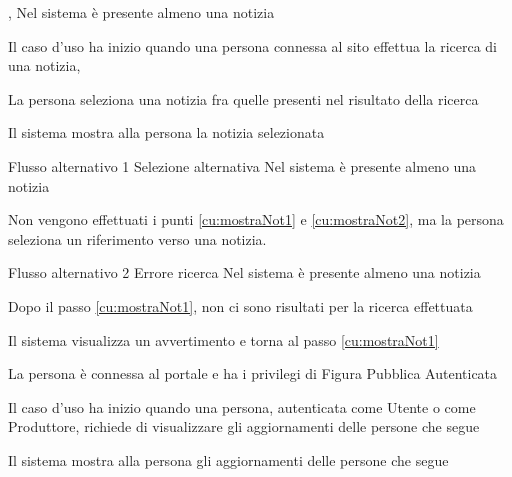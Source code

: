 %

\tabcuvspace

{, }
{Nel sistema è presente almeno una notizia}
{\postNulle}
{\begin{enumCU}
	\item Il caso d'uso ha inizio quando una persona connessa al sito effettua la ricerca di una notizia, \label{cu:mostraNot1}
	\item La persona seleziona una notizia fra quelle presenti nel risultato della ricerca\label{cu:mostraNot2}
	\item Il sistema mostra alla persona la notizia selezionata
\end{enumCU}}
%
{Flusso alternativo 1}%
{Selezione alternativa}%
{Nel sistema è presente almeno una notizia}%
{\postNulle}%
{\begin{enumCU}
		\item Non vengono effettuati i punti \ref{cu:mostraNot1} e \ref{cu:mostraNot2}, ma la persona seleziona un \gls{riferimento} verso una notizia.
\end{enumCU}}%
%
{Flusso alternativo 2}%
{Errore ricerca}%
{Nel sistema è presente almeno una notizia}%
{\postNulle}%
{\begin{enumCU}
		\item Dopo il passo \ref{cu:mostraNot1}, non ci sono risultati per la ricerca effettuata
		\item Il sistema visualizza un avvertimento e torna al passo \ref{cu:mostraNot1}
\end{enumCU}}%

\tabcuvspace

%

{}
{La persona è connessa al portale e ha i privilegi di Figura Pubblica Autenticata}
{\postNulle}
{\begin{enumCU}
	\item Il caso d'uso ha inizio quando una persona, autenticata come Utente o come Produttore, richiede di visualizzare gli aggiornamenti delle persone che segue
	\item Il sistema mostra alla persona gli aggiornamenti delle persone che segue
\end{enumCU}}



